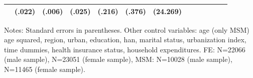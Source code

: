 \begin{table}[h]
\begin{adjustbox}{max width=\linewidth}
\begin{threeparttable}
{\begin{tabular}{l*{6}{SS}}
                &   (.022)         &   (.006)         &   (.025)         &   (.216)         &   (.376)         & (24.269)         \\                 
\bottomrule
\end{tabular}
\begin{tablenotes}
\item Notes:   Standard errors in parentheses.
Other control variables: age (only MSM) age squared, region, urban, education, han, marital status, urbanization index, time dummies, health insurance status, household expenditures. FE:  N=22066 (male sample), N=23051 (female sample), MSM: N=10028 (male sample), N=11465 (female sample).
\end{tablenotes}
}
\end{threeparttable}
\end{adjustbox}
\end{table}


